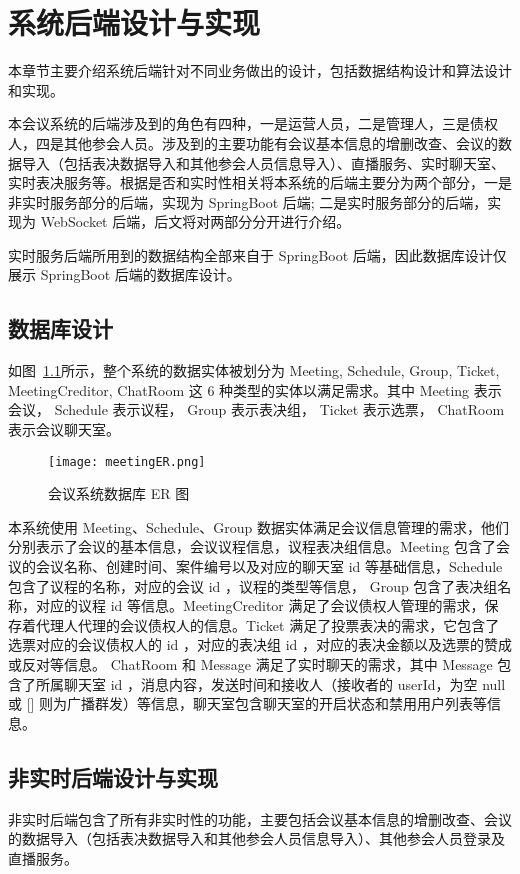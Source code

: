
\chapter{系统后端设计与实现}
本章节主要介绍系统后端针对不同业务做出的设计，包括数据结构设计和算法设计和实现。

本会议系统的后端涉及到的角色有四种，一是运营人员，二是管理人，三是债权人，四是其他参会人员。涉及到的主要功能有会议基本信息的增删改查、会议的数据导入（包括表决数据导入和其他参会人员信息导入）、直播服务、实时聊天室、实时表决服务等。根据是否和实时性相关将本系统的后端主要分为两个部分，一是非实时服务部分的后端，实现为 SpringBoot 后端; 二是实时服务部分的后端，实现为 WebSocket 后端，后文将对两部分分开进行介绍。

实时服务后端所用到的数据结构全部来自于 SpringBoot 后端，因此数据库设计仅展示 SpringBoot 后端的数据库设计。

\section{数据库设计}
如图~\ref{fig:meetingER}所示，整个系统的数据实体被划分为 Meeting, Schedule,
Group, Ticket, MeetingCreditor, ChatRoom 这 6 种类型的实体以满足需求。其中 Meeting 表示会议， Schedule 表示议程， Group 表示表决组， Ticket 表示选票， ChatRoom 表示会议聊天室。

\begin{figure}[!htp]
    \centering
    \texttt{[image: meetingER.png]}
    \caption{会议系统数据库 ER 图}
    \label{fig:meetingER}
  \end{figure}

本系统使用 Meeting、Schedule、Group 数据实体满足会议信息管理的需求，他们分别表示了会议的基本信息，会议议程信息，议程表决组信息。Meeting 包含了会议的会议名称、创建时间、案件编号以及对应的聊天室 id 等基础信息，Schedule 包含了议程的名称，对应的会议 id ，议程的类型等信息， Group 包含了表决组名称，对应的议程 id 等信息。MeetingCreditor 满足了会议债权人管理的需求，保存着代理人代理的会议债权人的信息。Ticket 满足了投票表决的需求，它包含了选票对应的会议债权人的 id ，对应的表决组 id ，对应的表决金额以及选票的赞成或反对等信息。 ChatRoom 和 Message 满足了实时聊天的需求，其中 Message 包含了所属聊天室 id ，消息内容，发送时间和接收人（接收者的 userId，为空 null 或 [] 则为广播群发）等信息，聊天室包含聊天室的开启状态和禁用用户列表等信息。

\section{非实时后端设计与实现}
非实时后端包含了所有非实时性的功能，主要包括会议基本信息的增删改查、会议的数据导入（包括表决数据导入和其他参会人员信息导入）、其他参会人员登录及直播服务。


